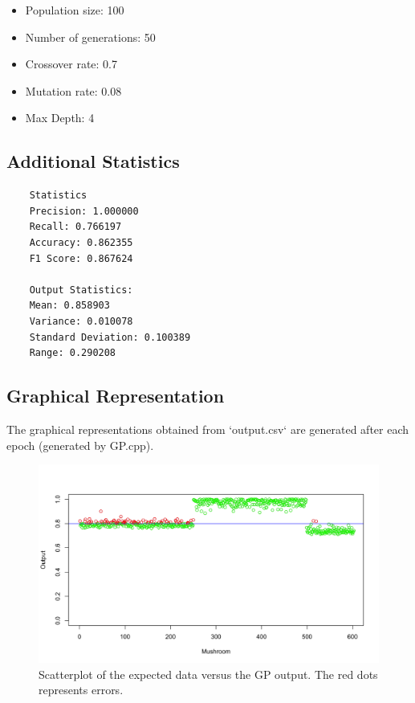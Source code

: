 \documentclass{article}
\begin{document}
\begin{itemize}
    \item Population size: 100
    \item Number of generations: 50
    \item Crossover rate: 0.7
    \item Mutation rate: 0.08
    \item Max Depth: 4
\end{itemize}

\subsection{Additional Statistics}
\begin{verbatim}
    Statistics
    Precision: 1.000000
    Recall: 0.766197
    Accuracy: 0.862355
    F1 Score: 0.867624

    Output Statistics:
    Mean: 0.858903
    Variance: 0.010078
    Standard Deviation: 0.100389
    Range: 0.290208
\end{verbatim}

\subsection{Graphical Representation}
The graphical representations obtained from `output.csv` are generated after each epoch (generated by GP.cpp).
    \begin{figure}[H]
        \includegraphics[width=\linewidth]{GP_scatterplot.png}
        \caption{Scatterplot of the expected data versus the GP output. The red dots represents errors.}
        \label{fig:ils}
    \end{figure}
\end{document}
